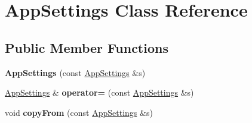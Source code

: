 \hypertarget{class_app_settings}{\section{App\-Settings Class Reference}
\label{class_app_settings}
}
\subsection*{Public Member Functions}
\begin{DoxyCompactItemize}
\item 
\hypertarget{class_app_settings_a6516ae98c8f20c16b8d856d1a896f0f4}{{\bfseries App\-Settings} (const \hyperlink{class_app_settings}{App\-Settings} \&s)}\label{class_app_settings_a6516ae98c8f20c16b8d856d1a896f0f4}

\item 
\hypertarget{class_app_settings_a88996b99b71f8987455d3804bdc58e87}{\hyperlink{class_app_settings}{App\-Settings} \& {\bfseries operator=} (const \hyperlink{class_app_settings}{App\-Settings} \&s)}\label{class_app_settings_a88996b99b71f8987455d3804bdc58e87}

\item 
\hypertarget{class_app_settings_a4cea6d4aedb1c7ef347079a703e097c1}{void {\bfseries copy\-From} (const \hyperlink{class_app_settings}{App\-Settings} \&s)}\label{class_app_settings_a4cea6d4aedb1c7ef347079a703e097c1}

\end{DoxyCompactItemize}
